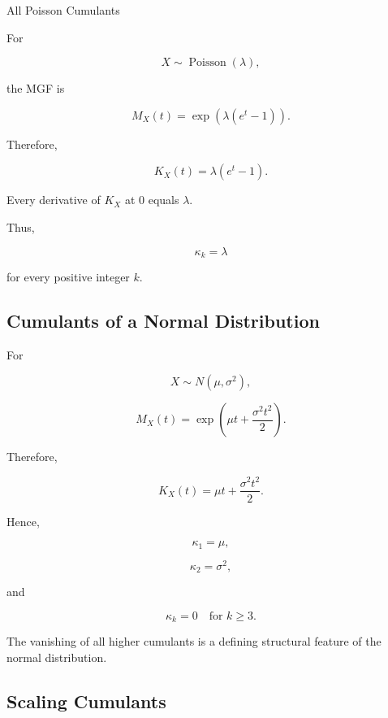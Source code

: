 \begin{workedexamplebox}{All Poisson Cumulants}

For

\[
X\sim\operatorname{Poisson}(\lambda),
\]

the MGF is

\[
M_X(t)
=
\exp
\left(
\lambda(e^t-1)
\right).
\]

Therefore,

\[
K_X(t)
=
\lambda(e^t-1).
\]

Every derivative of \(K_X\) at \(0\) equals \(\lambda\).

Thus,

\begin{answerbox}
\[
\boxed{
\kappa_k
=
\lambda
}
\]

for every positive integer \(k\).
\end{answerbox}

\end{workedexamplebox}

\subsection{Cumulants of a Normal Distribution}
\label{subsec:normal-cumulants}

For

\[
X\sim N(\mu,\sigma^2),
\]

\[
M_X(t)
=
\exp
\left(
\mu t+\frac{\sigma^2t^2}{2}
\right).
\]

Therefore,

\[
K_X(t)
=
\mu t
+
\frac{\sigma^2t^2}{2}.
\]

Hence,

\[
\boxed{
\kappa_1=\mu,
}
\]

\[
\boxed{
\kappa_2=\sigma^2,
}
\]

and

\[
\boxed{
\kappa_k=0
\quad
\text{for }k\geq3.
}
\]

The vanishing of all higher cumulants is a defining structural feature
of the normal distribution.

\subsection{Scaling Cumulants}
\label{subsec:scaling-cumulants}

